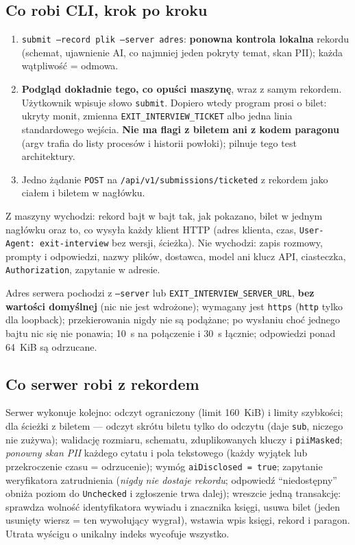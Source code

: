 \subsection{Co robi CLI, krok po kroku}

\begin{enumerate}[itemsep=2pt]
  \item \texttt{submit --record plik --server adres}: \textbf{ponowna kontrola
        lokalna} rekordu (schemat, ujawnienie AI, co najmniej jeden pokryty
        temat, skan PII); każda wątpliwość = odmowa.
  \item \textbf{Podgląd dokładnie tego, co opuści maszynę}, wraz z samym
        rekordem. Użytkownik wpisuje słowo \texttt{submit}. Dopiero wtedy
        program prosi o bilet: ukryty monit, zmienna
        \texttt{EXIT\_}\allowbreak\texttt{INTERVIEW\_}\allowbreak\texttt{TICKET} albo jedna linia standardowego wejścia.
        \textbf{Nie ma flagi z biletem ani z kodem paragonu} (argv trafia do
        listy procesów i historii powłoki); pilnuje tego test architektury.
  \item Jedno żądanie \texttt{POST} na \texttt{/api/v1/submissions/ticketed}
        z rekordem jako ciałem i biletem w nagłówku.
\end{enumerate}

Z maszyny wychodzi: rekord bajt w bajt tak, jak pokazano, bilet w jednym
nagłówku oraz to, co wysyła każdy klient HTTP (adres klienta, czas,
\texttt{User-Agent: exit-interview} bez wersji, ścieżka). Nie wychodzi: zapis
rozmowy, prompty i odpowiedzi, nazwy plików, dostawca, model ani klucz API,
ciasteczka, \texttt{Authorization}, zapytanie w adresie.

Adres serwera pochodzi z \texttt{--server} lub
\texttt{EXIT\_}\allowbreak\texttt{INTERVIEW\_}\allowbreak\texttt{SERVER\_URL}, \textbf{bez wartości domyślnej} (nic nie
jest wdrożone); wymagany jest \texttt{https} (\texttt{http} tylko dla
loopback); przekierowania nigdy nie są podążane; po wysłaniu choć jednego
bajtu nic się nie ponawia; 10~s na połączenie i 30~s łącznie; odpowiedzi
ponad 64~KiB są odrzucane.

\subsection{Co serwer robi z rekordem}

Serwer wykonuje kolejno: odczyt ograniczony (limit 160~KiB) i limity szybkości;
dla ścieżki z biletem --- odczyt skrótu biletu tylko do odczytu (daje \texttt{sub},
niczego nie zużywa); walidację rozmiaru, schematu, zduplikowanych kluczy
i \texttt{piiMasked}; \emph{ponowny skan PII} każdego cytatu i pola
tekstowego (każdy wyjątek lub przekroczenie czasu = odrzucenie); wymóg
\texttt{aiDisclosed = true}; zapytanie weryfikatora zatrudnienia
(\emph{nigdy nie dostaje rekordu}; odpowiedź ``niedostępny'' obniża poziom do
\texttt{Unchecked} i zgłoszenie trwa dalej); wreszcie jedną transakcję: sprawdza
wolność identyfikatora wywiadu i znacznika księgi, usuwa bilet (jeden
usunięty wiersz = ten wywołujący wygrał), wstawia wpis księgi, rekord
i paragon. Utrata wyścigu o unikalny indeks wycofuje wszystko.

